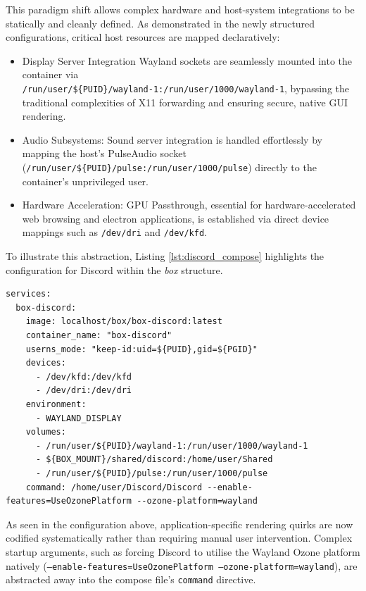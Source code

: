 \documentclass[journal,onecolumn]{IEEEtran}
\newcommand{\code}[1]{\texttt{#1}}
\begin{document}
This paradigm shift allows complex hardware and host-system integrations to be statically and cleanly defined. As demonstrated in the newly structured configurations, critical host resources are mapped declaratively:
\begin{itemize}
    \item Display Server Integration Wayland sockets are seamlessly mounted into the container via \\\code{/run/user/\$\{PUID\}/wayland-1:/run/user/1000/wayland-1}, bypassing the traditional complexities of X11 forwarding and ensuring secure, native GUI rendering.
    \item Audio Subsystems: Sound server integration is handled effortlessly by mapping the host's PulseAudio socket \\(\code{/run/user/\$\{PUID\}/pulse:/run/user/1000/pulse}) directly to the container's unprivileged user.
    \item Hardware Acceleration: GPU Passthrough, essential for hardware-accelerated web browsing and electron applications, is established via direct device mappings such as \code{/dev/dri} and \code{/dev/kfd}.
\end{itemize}

To illustrate this abstraction, Listing \ref{lst:discord_compose} highlights the configuration for Discord within the \textit{box} structure.

\begin{lstlisting}[caption={Declarative host integration within the \code{box} Discord compose configuration}, label={lst:discord_compose}]
services:
  box-discord:
    image: localhost/box/box-discord:latest
    container_name: "box-discord"
    userns_mode: "keep-id:uid=${PUID},gid=${PGID}"
    devices:
      - /dev/kfd:/dev/kfd
      - /dev/dri:/dev/dri
    environment:
      - WAYLAND_DISPLAY
    volumes:
      - /run/user/${PUID}/wayland-1:/run/user/1000/wayland-1
      - ${BOX_MOUNT}/shared/discord:/home/user/Shared
      - /run/user/${PUID}/pulse:/run/user/1000/pulse
    command: /home/user/Discord/Discord --enable-features=UseOzonePlatform --ozone-platform=wayland
\end{lstlisting}

As seen in the configuration above, application-specific rendering quirks are now codified systematically rather than requiring manual user intervention. Complex startup arguments, such as forcing Discord to utilise the Wayland Ozone platform natively (\code{--enable-features=UseOzonePlatform --ozone-platform=wayland}), are abstracted away into the compose file's \code{command} directive. 
\end{document}
